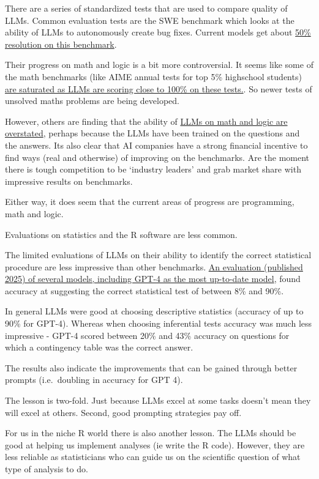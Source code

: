 \documentclass[
  letterpaper,
  DIV=11,
  numbers=noendperiod]{scrreprt}
\begin{document}
There are a series of standardized tests that are used to compare
quality of LLMs. Common evaluation tests are the SWE benchmark which
looks at the ability of LLMs to autonomously create bug fixes. Current
models get about \href{https://www.swebench.com/}{50\% resolution on
this benchmark}.

Their progress on math and logic is a bit more controversial. It seems
like some of the math benchmarks (like AIME annual tests for top 5\%
highschool students)
\href{https://epoch.ai/frontiermath/the-benchmark}{are saturated as LLMs
are scoring close to 100\% on these tests.}. So newer tests of unsolved
maths problems are being developed.

However, others are finding that the ability of
\href{https://garymarcus.substack.com/p/reports-of-llms-mastering-math-have}{LLMs
on math and logic are overstated}, perhaps because the LLMs have been
trained on the questions and the answers. Its also clear that AI
companies have a strong financial incentive to find ways (real and
otherwise) of improving on the benchmarks. Are the moment there is tough
competition to be `industry leaders' and grab market share with
impressive results on benchmarks.

Either way, it does seem that the current areas of progress are
programming, math and logic.

Evaluations on statistics and the R software are less common.

The limited evaluations of LLMs on their ability to identify the correct
statistical procedure are less impressive than other benchmarks.
\href{https://arxiv.org/abs/2406.07815}{An evaluation (published 2025)
of several models, including GPT-4 as the most up-to-date model}, found
accuracy at suggesting the correct statistical test of between 8\% and
90\%.

In general LLMs were good at choosing descriptive statistics (accuracy
of up to 90\% for GPT-4). Whereas when choosing inferential tests
accuracy was much less impressive - GPT-4 scored between 20\% and 43\%
accuracy on questions for which a contingency table was the correct
answer.

The results also indicate the improvements that can be gained through
better prompts (i.e.~doubling in accuracy for GPT 4).

The lesson is two-fold. Just because LLMs excel at some tasks doesn't
mean they will excel at others. Second, good prompting strategies pay
off.

For us in the niche R world there is also another lesson. The LLMs
should be good at helping us implement analyses (ie write the R code).
However, they are less reliable as statisticians who can guide us on the
scientific question of what type of analysis to do.
\end{document}
